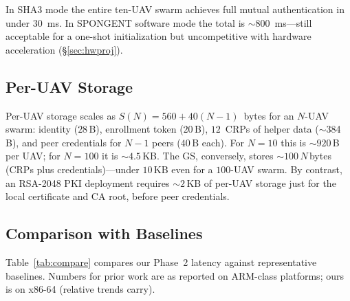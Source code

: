 \documentclass[conference,a4paper,10pt]{IEEEtran}
\begin{document}
In SHA3 mode the entire ten-UAV swarm achieves full mutual
authentication in under $30$~ms. In SPONGENT software mode the
total is $\sim$800~ms---still acceptable for a one-shot
initialization but uncompetitive with hardware acceleration
(\S\ref{sec:hwproj}).

\subsection{Per-UAV Storage}
\label{sec:storage}
Per-UAV storage scales as $S(N) = 560 + 40(N-1)$~bytes for an
$N$-UAV swarm: identity ($28$\,B), enrollment token ($20$\,B),
$12$~CRPs of helper data ($\sim$384\,B), and peer credentials for
$N{-}1$ peers ($40$\,B each). For $N{=}10$ this is $\sim 920$\,B per
UAV; for $N{=}100$ it is $\sim 4.5$\,KB. The GS, conversely, stores
$\sim 100\,N$\,bytes (CRPs plus credentials)---under $10$\,KB even
for a $100$-UAV swarm. By contrast, an RSA-2048 PKI deployment
requires $\sim 2$\,KB of per-UAV storage just for the local
certificate and CA root, before peer credentials.

\subsection{Comparison with Baselines}
\label{sec:compare}
Table~\ref{tab:compare} compares our Phase~2 latency against
representative baselines. Numbers for prior work are as reported on
ARM-class platforms; ours is on x86-64 (relative trends carry).
\end{document}
